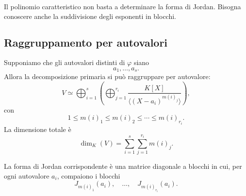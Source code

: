 \documentclass[a4paper]{article}
\begin{document}
\begin{radioactive}
\begin{snippetremark}{}
    Il polinomio caratteristico non basta a determinare la forma di Jordan.
    Bisogna conoscere anche la suddivisione degli esponenti in blocchi.
\end{snippetremark}
\end{radioactive}

\subsection{Raggruppamento per autovalori}

\begin{radioactive}
Supponiamo che gli autovalori distinti di \(\varphi\) siano
\[
    a_1,\ldots,a_s.
\]
Allora la decomposizione primaria si può raggruppare per autovalore:
\[
    V\simeq
    \bigoplus_{i=1}^s
    \left(
        \bigoplus_{j=1}^{r_i}
        \frac{K[X]}{\langle (X-a_i)^{m(i)_j} \rangle}
    \right),
\]
con
\[
    1\leq m(i)_1\leq m(i)_2\leq\cdots\leq m(i)_{r_i}.
\]
La dimensione totale è
\[
    \dim_K(V)
    =
    \sum_{i=1}^s
    \sum_{j=1}^{r_i} m(i)_j.
\]

La forma di Jordan corrispondente è una matrice diagonale a blocchi in cui, per ogni autovalore \(a_i\), compaiono i blocchi
\[
    J_{m(i)_1}(a_i),
    \quad
    \ldots,
    \quad
    J_{m(i)_{r_i}}(a_i).
\]


\end{radioactive}
\end{document}
